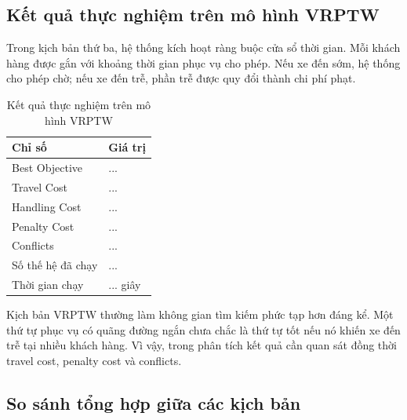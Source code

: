 \documentclass[12pt,a4paper]{article}
\numberwithin{figure}{subsection}
\begin{document}
\subsection{Kết quả thực nghiệm trên mô hình VRPTW}

Trong kịch bản thứ ba, hệ thống kích hoạt ràng buộc cửa sổ thời gian. Mỗi khách hàng được gắn với khoảng thời gian phục vụ cho phép. Nếu xe đến sớm, hệ thống cho phép chờ; nếu xe đến trễ, phần trễ được quy đổi thành chi phí phạt.

\begin{table}[H]
    \centering
    \caption{Kết quả thực nghiệm trên mô hình VRPTW}
    \label{tab:vrptw_result}
    \renewcommand{\arraystretch}{1.35}
    \begin{tabular}{|p{6cm}|p{6cm}|}
        \hline
        \textbf{Chỉ số} & \textbf{Giá trị} \\
        \hline
        Best Objective & ... \\
        \hline
        Travel Cost & ... \\
        \hline
        Handling Cost & ... \\
        \hline
        Penalty Cost & ... \\
        \hline
        Conflicts & ... \\
        \hline
        Số thế hệ đã chạy & ... \\
        \hline
        Thời gian chạy & ... giây \\
        \hline
    \end{tabular}
\end{table}

Kịch bản VRPTW thường làm không gian tìm kiếm phức tạp hơn đáng kể. Một thứ tự phục vụ có quãng đường ngắn chưa chắc là thứ tự tốt nếu nó khiến xe đến trễ tại nhiều khách hàng. Vì vậy, trong phân tích kết quả cần quan sát đồng thời travel cost, penalty cost và conflicts.
\subsection{So sánh tổng hợp giữa các kịch bản}
\end{document}
